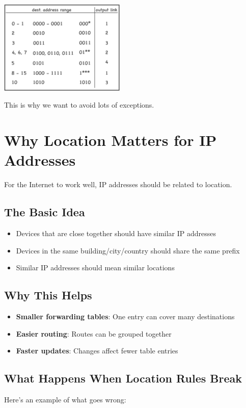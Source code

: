 \documentclass[../../compsys.tex]{subfiles}
\begin{document}
\begin{center}
    \includegraphics[width=0.45\textwidth]{images/many-exceptions.png}
\end{center}

This is why we want to avoid lots of exceptions.

\section{Why Location Matters for IP Addresses}
For the Internet to work well, IP addresses should be related to location.

\subsection{The Basic Idea}
\begin{itemize}
    \item Devices that are close together should have similar IP addresses
    \item Devices in the same building/city/country should share the same prefix
    \item Similar IP addresses should mean similar locations
\end{itemize}

\subsection{Why This Helps}
\begin{itemize}
    \item \textbf{Smaller forwarding tables}: One entry can cover many destinations
    \item \textbf{Easier routing}: Routes can be grouped together
    \item \textbf{Faster updates}: Changes affect fewer table entries
\end{itemize}

\subsection{What Happens When Location Rules Break}
Here's an example of what goes wrong:
\end{document}
